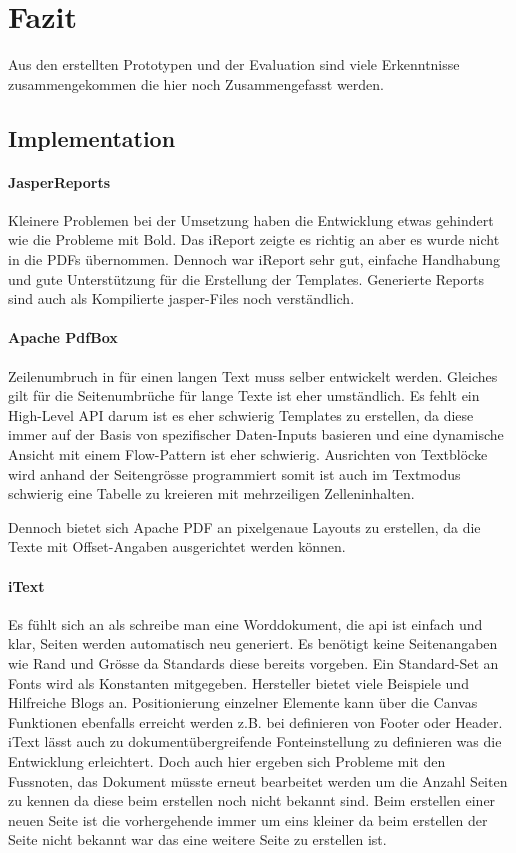 \documentclass[main.tex]{subfiles}
\begin{document}
\chapter{Fazit}

Aus den erstellten Prototypen und der Evaluation sind viele Erkenntnisse zusammengekommen die hier noch Zusammengefasst werden. 

\section{Implementation}

\subsubsection{JasperReports}
Kleinere Problemen bei der Umsetzung haben die Entwicklung etwas gehindert wie die  Probleme mit Bold. Das iReport zeigte es richtig an aber es wurde nicht in die PDFs übernommen. Dennoch war iReport sehr gut, einfache Handhabung und gute Unterstützung für die Erstellung der Templates. Generierte Reports sind auch als Kompilierte  jasper-Files noch verständlich.  


\subsubsection{Apache PdfBox}
Zeilenumbruch in für einen langen Text muss selber entwickelt werden. Gleiches gilt für die Seitenumbrüche für lange Texte ist eher umständlich. Es fehlt ein High-Level API darum ist es eher schwierig Templates zu erstellen, da diese immer auf der Basis von spezifischer Daten-Inputs basieren und eine dynamische Ansicht mit einem Flow-Pattern ist eher schwierig. Ausrichten von Textblöcke wird anhand der Seitengrösse  programmiert somit ist auch im Textmodus schwierig eine Tabelle zu kreieren mit mehrzeiligen Zelleninhalten.

Dennoch bietet sich Apache PDF an pixelgenaue Layouts zu erstellen, da die Texte mit Offset-Angaben ausgerichtet werden können. 

\subsubsection{iText}
Es fühlt sich an als schreibe man eine Worddokument, die \acrlong{api} ist einfach und klar, Seiten werden automatisch neu generiert. Es benötigt keine Seitenangaben wie Rand und Grösse da Standards diese bereits vorgeben. Ein Standard-Set an Fonts wird als Konstanten mitgegeben. Hersteller bietet viele Beispiele und Hilfreiche Blogs an. 
Positionierung einzelner Elemente kann über die Canvas Funktionen ebenfalls erreicht werden z.B.  bei definieren von Footer oder Header. 
iText lässt auch zu dokumentübergreifende Fonteinstellung zu definieren was die Entwicklung erleichtert. 
Doch auch hier ergeben sich Probleme mit den Fussnoten, das Dokument müsste erneut bearbeitet werden um die Anzahl Seiten zu kennen da diese beim erstellen noch nicht bekannt sind. Beim erstellen einer neuen Seite ist die vorhergehende immer um eins kleiner da beim erstellen der Seite nicht bekannt war das eine weitere Seite zu erstellen ist.
\end{document}
